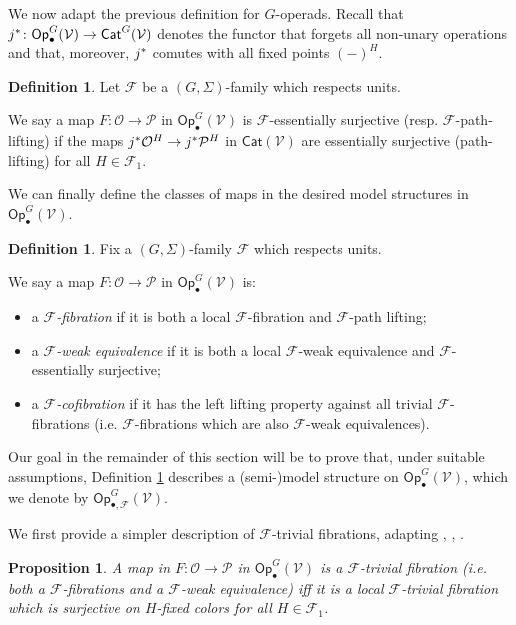 \documentclass[a4paper,10pt
,draft
]{article}%
\numberwithin{equation}{section}
\numberwithin{figure}{section}
\newtheorem{proposition}[equation]{Proposition}%
\theoremstyle{definition} %
\newtheorem{definition}[equation]{Definition}%
\newcommand{\F}{\ensuremath{\mathcal F}}
\newcommand{\V}{\ensuremath{\mathcal V}}
\renewcommand{\O}{\ensuremath{\mathcal O}}
\renewcommand{\P}{\ensuremath{\mathcal P}}
\newcommand{\1}{\ensuremath{\mathbbm 1}}%
\begin{document}
We now adapt the previous definition for $G$-operads.
Recall that $j^{\**} \colon \mathsf{Op}^G_\bullet(\V) \to \mathsf{Cat}^G(\V)$
denotes the functor that forgets all non-unary operations and that, moreover, 
$j^{\**}$ comutes with all fixed points $(-)^H$.


\begin{definition}\label{FESSENSURJ DEF}
Let $\F$ be a $(G, \Sigma)$-family which respects units.

We say a map $F: \O \to \P$ in $\mathsf{Op}^G_\bullet(\V)$
is $\F$-essentially surjective (resp. $\F$-path-lifting)
if the maps
$j^{\**}\O^H \to j^{\**} \P^H$
in $\mathsf{Cat}(\V)$ are essentially surjective (path-lifting) for all $H \in \F_1$.
\end{definition}



We can finally define the classes of maps in the desired model structures in $\mathsf{Op}^G_\bullet(\V)$.



\begin{definition}\label{MODEL_DEFN}
Fix a $(G, \Sigma)$-family $\F$ which respects units.

We say a map $F: \O \to \P$ in $\mathsf{Op}^G_\bullet(\V)$ is:
\begin{itemize}
	\item a {\em $\F$-fibration} if it is both a local $\F$-fibration and $\F$-path lifting;
	\item a {\em $\F$-weak equivalence} if it is both a local $\F$-weak equivalence and $\F$-essentially surjective;
	\item a \textit{$\F$-cofibration} if it has the left lifting property against all trivial $\F$-fibrations (i.e. $\F$-fibrations which are also $\F$-weak equivalences).
\end{itemize}
\end{definition}


Our goal in the remainder of this section will be to prove that, 
under suitable assumptions, 
Definition \ref{MODEL_DEFN} describes a (semi-)model structure on 
$\mathsf{Op}^G_\bullet(\V)$, which we denote by
$\mathsf{Op}^G_{\bullet, \F}(\V)$.

We first provide a simpler description of $\F$-trivial fibrations,
adapting \cite[4.8]{Cav}, \cite[2.3]{BM13}, \cite[1.18]{CM13b}.

\begin{proposition}\label{FTRIVCHAR PROP}
A map in $F: \O \to \P$ in $\mathsf{Op}^G_\bullet(\V)$ is 
a $\F$-trivial fibration (i.e. both a $\F$-fibrations and a $\F$-weak equivalence) 
iff it is a local $\F$-trivial fibration which is surjective on 
$H$-fixed colors for all $H \in \F_1$.
\end{proposition}
\end{document}
